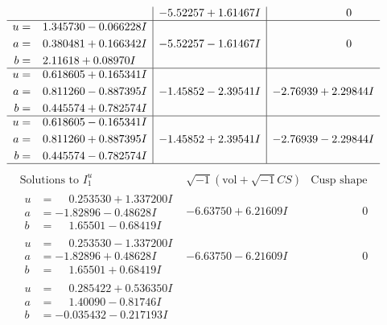 \documentclass[1p]{elsarticle_modified}
\theoremstyle{definition}
\newcommand{\I}{\sqrt{-1}}
\begin{document}
$$\begin{array}{c|c|c}
 & -5.52257 + 1.61467 I & \phantom{-0.000000 } 0 \\ \hline\begin{aligned}
u &= \phantom{-}1.345730 - 0.066228 I \\
a &= \phantom{-}0.380481 + 0.166342 I \\
b &= \phantom{-}2.11618 + 0.08970 I\end{aligned}
 & -5.52257 - 1.61467 I & \phantom{-0.000000 } 0 \\ \hline\begin{aligned}
u &= \phantom{-}0.618605 + 0.165341 I \\
a &= \phantom{-}0.811260 - 0.887395 I \\
b &= \phantom{-}0.445574 + 0.782574 I\end{aligned}
 & -1.45852 - 2.39541 I & -2.76939 + 2.29844 I \\ \hline\begin{aligned}
u &= \phantom{-}0.618605 - 0.165341 I \\
a &= \phantom{-}0.811260 + 0.887395 I \\
b &= \phantom{-}0.445574 - 0.782574 I\end{aligned}
 & -1.45852 + 2.39541 I & -2.76939 - 2.29844 I\\
 \hline 
 \end{array}$$\newpage$$\begin{array}{c|c|c}  
\text{Solutions to }I^u_{1}& \I (\text{vol} + \sqrt{-1}CS) & \text{Cusp shape}\\
 \hline 
\begin{aligned}
u &= \phantom{-}0.253530 + 1.337200 I \\
a &= -1.82896 - 0.48628 I \\
b &= \phantom{-}1.65501 - 0.68419 I\end{aligned}
 & -6.63750 + 6.21609 I & \phantom{-0.000000 } 0 \\ \hline\begin{aligned}
u &= \phantom{-}0.253530 - 1.337200 I \\
a &= -1.82896 + 0.48628 I \\
b &= \phantom{-}1.65501 + 0.68419 I\end{aligned}
 & -6.63750 - 6.21609 I & \phantom{-0.000000 } 0 \\ \hline\begin{aligned}
u &= \phantom{-}0.285422 + 0.536350 I \\
a &= \phantom{-}1.40090 - 0.81746 I \\
b &= -0.035432 - 0.217193 I\end{aligned}

\end{array}$$
\end{document}
